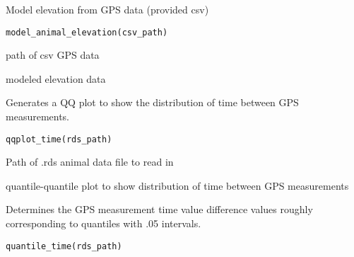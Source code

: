 \documentclass[a4paper]{book}
\begin{document}
%
\begin{Description}\relax
Model elevation from GPS data (provided csv)
\end{Description}
%
\begin{Usage}
\begin{verbatim}
model_animal_elevation(csv_path)
\end{verbatim}
\end{Usage}
%
\begin{Arguments}
\begin{ldescription}
\item[\code{csv\_path}] path of csv GPS data
\end{ldescription}
\end{Arguments}
%
\begin{Value}
modeled elevation data
\end{Value}
%
\begin{Description}\relax
Generates a QQ plot to show the distribution of time between GPS measurements.
\end{Description}
%
\begin{Usage}
\begin{verbatim}
qqplot_time(rds_path)
\end{verbatim}
\end{Usage}
%
\begin{Arguments}
\begin{ldescription}
\item[\code{rds\_path}] Path of .rds animal data file to read in
\end{ldescription}
\end{Arguments}
%
\begin{Value}
quantile-quantile plot to show distribution of time between GPS measurements
\end{Value}
%
\begin{Description}\relax
Determines the GPS measurement time value difference values
roughly corresponding to quantiles with .05 intervals.
\end{Description}
%
\begin{Usage}
\begin{verbatim}
quantile_time(rds_path)
\end{verbatim}
\end{Usage}
\end{document}
